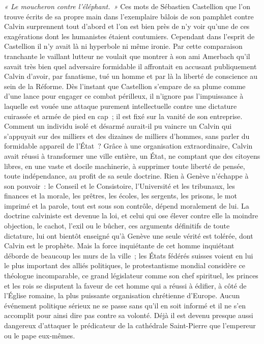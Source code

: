 \documentclass[french,twoside]{book} %
\newcommand\chaptercont{} %
\begin{document}
\chaptercont
\noindent \emph{« Le moucheron contre l’éléphant. »} Ces mots de Sébastien Castellion que l’on trouve écrits de sa propre main dans l’exemplaire bâlois de son pamphlet contre Calvin surprennent tout d’abord et l’on est bien près de n’y voir qu’une de ces exagérations dont les humanistes étaient coutumiers. Cependant dans l’esprit de Castellion il n’y avait là ni hyperbole ni même ironie. Par cette comparaison tranchante le vaillant lutteur ne voulait que montrer à son ami Amerbach qu’il savait très bien quel adversaire formidable il affrontait en accusant publiquement Calvin d’avoir, par fanatisme, tué un homme et par là la liberté de conscience au sein de la Réforme. Dès l’instant que Castellion s’empare de sa plume comme d’une lance pour engager ce combat périlleux, il n’ignore pas l’impuissance à laquelle est vouée une attaque purement intellectuelle contre une dictature cuirassée et armée de pied en cap ; il est fixé sur la vanité de son entreprise. Comment un individu isolé et désarmé aurait-il pu vaincre un Calvin qui s’appuyait sur des milliers et des dizaines de milliers d’hommes, sans parler du formidable appareil de l’État ? Grâce à une organisation extraordinaire, Calvin avait réussi à transformer une ville entière, un État, ne comptant que des citoyens libres, en une vaste et docile machinerie, à supprimer toute liberté de pensée, toute indépendance, au profit de sa seule doctrine. Rien à Genève n’échappe à son pouvoir : le Conseil et le Consistoire, l’Université et les tribunaux, les finances et la morale, les prêtres, les écoles, les sergents, les prisons, le mot imprimé et la parole, tout est sous son contrôle, dépend moralement de lui. La doctrine calviniste est devenue la loi, et celui qui ose élever contre elle la moindre objection, le cachot, l’exil ou le bûcher, ces arguments définitifs de toute dictature, lui ont bientôt enseigné qu’à Genève une seule vérité est tolérée, dont Calvin est le prophète. Mais la force inquiétante de cet homme inquiétant déborde de beaucoup les murs de la ville ; les États fédérés suisses voient en lui le plus important des alliés politiques, le protestantisme mondial considère ce théologue incomparable, ce grand législateur comme son chef spirituel, les princes et les rois se disputent la faveur de cet homme qui a réussi à édifier, à côté de l’Église romaine, la plus puissante organisation chrétienne d’Europe. Aucun événement politique sérieux ne se passe sans qu’il en soit informé et il ne s’en accomplit pour ainsi dire pas contre sa volonté. Déjà il est devenu presque aussi dangereux d’attaquer le prédicateur de la cathédrale Saint-Pierre que l’empereur ou le pape eux-mêmes.\par
\end{document}
